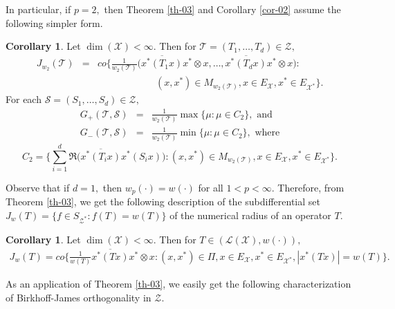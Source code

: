 \documentclass{amsart}
\theoremstyle{definition}
\newtheorem{cor}[theorem]{Corollary}
\theoremstyle{remark}
\numberwithin{equation}{section}
\begin{document}
In particular, if $p=2,$ then Theorem \ref{th-03} and Corollary \ref{cor-02} assume the following simpler form.
\begin{cor}\label{cor-03}
		Let $\dim(\mathcal{X})<\infty.$ Then for $\mathcal{T}=(T_1,\ldots,T_d)\in \mathcal{Z},$ 
	\begin{eqnarray*}
		J_{w_2}(\mathcal{T})
		&=&co\bigg\{\frac{1}{w_2(\mathcal{T})}\bigg(\overline{x^*(T_1x)}x^*\otimes x,\ldots,\overline{x^*(T_dx)}x^*\otimes x\bigg):\\
		&&\quad \quad \quad \quad \quad \quad(x,x^*)\in M_{w_2(\mathcal{T})}, x\in E_{\mathcal{X}},x^*\in E_{\mathcal{X}^*}\bigg\}.
	\end{eqnarray*}
For each $\mathcal{S}=(S_1,\ldots,S_d) \in \mathcal{Z},$ 
	\begin{eqnarray*}
	G_+(\mathcal{T},\mathcal{S})
	&=&\frac{1}{w_2(\mathcal{T})}\max\{\mu:\mu\in C_2\}, \text{ and }\\
	G_-(\mathcal{T},\mathcal{S})
	&=&\frac{1}{w_2(\mathcal{T})}\min\{\mu:\mu\in C_2\}, \text{ where}
\end{eqnarray*}
\[C_2=\bigg\{\sum_{i=1}^d\Re\bigg(\overline{x^*(T_ix)}x^*(S_ix) \bigg):(x,x^*)\in M_{w_2(\mathcal{T})}, x\in E_{\mathcal{X}},x^*\in E_{\mathcal{X}^*}\bigg\}.\]
\end{cor}

Observe that if $d=1,$ then $w_p(\cdot)=w(\cdot)$ for all $1<p<\infty.$ Therefore, from Theorem \ref{th-03}, we get the following description of the  subdifferential set $J_w(T)=\{f\in S_{\mathcal{Z}^*}:f(T)=w(T)\}$ of the numerical radius of an operator $T$.


\begin{cor}\label{cor-10}
	Let $\dim(\mathcal{X})<\infty.$ Then for $T\in (\mathcal{L}(\mathcal{X}),w(\cdot)),$ 
	\begin{eqnarray*}
		J_{w}(T)
		=co\bigg\{\frac{1}{w(T)}\overline{x^*(Tx)}x^*\otimes x:(x,x^*)\in \Pi, x\in E_{\mathcal{X}},x^*\in E_{\mathcal{X}^*}, |x^*(Tx)|=w(T)\bigg\}.
	\end{eqnarray*}
\end{cor}







As an application of Theorem \ref{th-03}, we easily get the following characterization of Birkhoff-James orthogonality in $\mathcal{Z}.$
\end{document}
